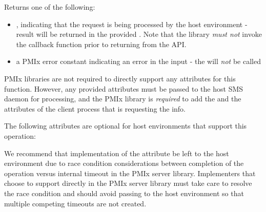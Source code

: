 \begin{arglist}
\end{arglist}

Returns one of the following:

\begin{itemize}
    \item {}, indicating that the request is being processed by the host environment - result will be returned in the provided . Note that the library \emph{must not} invoke the callback function prior to returning from the \ac{API}.
    \item a PMIx error constant indicating an error in the input - the  will \textit{not} be called
\end{itemize}


\reqattrstart
\ac{PMIx} libraries are not required to directly support any attributes for this function. However, any provided attributes must be passed to the host \ac{SMS} daemon for processing, and the \ac{PMIx} library is \textit{required} to add the  and the  attributes of the client process that is requesting the info.

\reqattrend

\optattrstart
The following attributes are optional for host environments that support this operation:


\optattrend

\adviceimplstart
We recommend that implementation of the  attribute be left to the host environment due to race condition considerations between completion of the operation versus internal timeout in the \ac{PMIx} server library. Implementers that choose to support  directly in the \ac{PMIx} server library must take care to resolve the race condition and should avoid passing  to the host environment so that multiple competing timeouts are not created.
\adviceimplend


\descr


